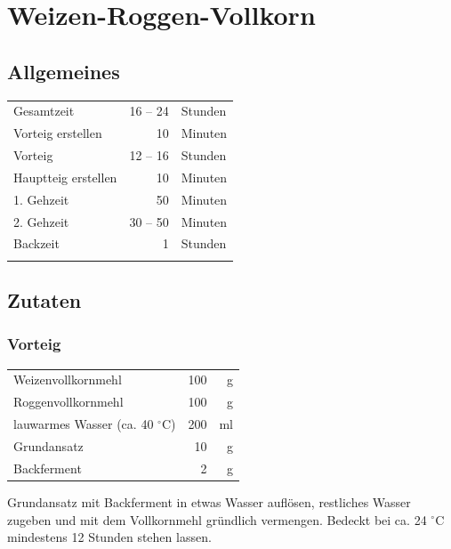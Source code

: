 \section{Weizen-Roggen-Vollkorn} 
\subsection*{Allgemeines}
\begin{tabular}{lrl}
    Gesamtzeit          & 16 --  24 & Stunden                       \\
    Vorteig erstellen   &        10 & Minuten                       \\
    Vorteig             &  12 -- 16 & Stunden                       \\
    Hauptteig erstellen &        10 & Minuten                       \\
    1. Gehzeit          &        50 & Minuten                       \\
    2. Gehzeit          &  30 -- 50 & Minuten                       \\
    Backzeit            &         1 & Stunden                       \\
    &           & \cite[Seite 66 ]{Pokorny2016}
\end{tabular} 
\subsection*{Zutaten}

\subsubsection*{Vorteig}
\begin{tabular}{lrr}
    Weizenvollkornmehl                  & 100 &  g \\
    Roggenvollkornmehl                  & 100 &  g \\
    lauwarmes Wasser (ca. 40 $^\circ$C) & 200 & ml \\
    Grundansatz                         &  10 &  g \\
    Backferment                         &   2 &  g
\end{tabular} 

Grundansatz mit Backferment in etwas Wasser auflösen, restliches Wasser zugeben und mit dem Vollkornmehl gründlich vermengen. Bedeckt bei ca. 24 $^{\circ} $C mindestens 12 Stunden stehen lassen. 

